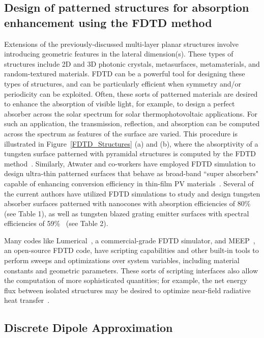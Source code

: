 \documentclass[review]{elsarticle}
\begin{document}
\subsection{Design of patterned structures for absorption enhancement using the FDTD method}
Extensions of the previously-discussed multi-layer planar structures involve introducing geometric features in the
lateral dimension(s).  These types of structures include 2D and 3D photonic crystals, metasurfaces, metamaterials, and random-textured materials.
FDTD can be a powerful tool for designing these types of structures, and can be particularly efficient when symmetry and/or periodicity can be
exploited.  Often, these sorts of patterned materials are desired to enhance the absorption of visible light, for example, to design a perfect
absorber across the solar spectrum for solar thermophotovoltaic applications.  For such an application, the transmission, reflection, and
absorption can be computed across the spectrum as features of the surface are varied.  This procedure is illustrated in Figure~\ref{FDTD_Structures} (a) and (b), where the absorptivity of a tungsten surface patterned with pyramidal structures is computed by the FDTD method~\cite{paper1_ref4}. Similarly, Atwater and co-workers
have employed FDTD simulation to design ultra-thin patterned surfaces that behave as broad-band
``super absorbers" capable of enhancing conversion efficiency in
thin-film PV materials~\cite{AFB_NatComm_2011}.  Several of the current authors have utilized FDTD simulations to 
study and
design tungsten absorber surfaces patterned with nanocones 
with absorption efficiencies of 80\%~\cite{me1} (see Table 1),
as well as tungsten blazed grating emitter surfaces with spectral efficiencies of 59\%~\cite{me2} (see Table 2).

Many codes like Lumerical~\cite{lumerical}, a commercial-grade
FDTD simulator, and MEEP~\cite{Meep}, an open-source FDTD code, have scripting
capabilities and other built-in tools to perform sweeps and optimizations over system variables, including material constants and geometric
parameters.  
These sorts of scripting interfaces also allow the computation of more sophisticated quantities; for example, the net energy flux between isolated
structures may be desired to optimize near-field radiative heat transfer~\cite{datas2013}.

\subsection{Discrete Dipole Approximation}
\end{document}
